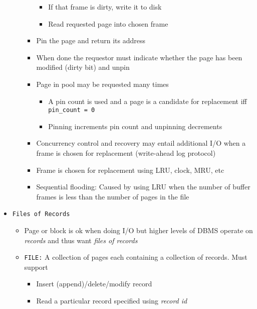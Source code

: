 \documentclass[landscape,8pt]{extarticle}
\newcommand{\code}{\lstinline}
\begin{document}
\begin{multicols}{4}
\begin{itemize}
\begin{itemize}
\begin{itemize}
\begin{itemize}
                                      \item If that frame is dirty, write it to disk
                                      \item Read requested page into chosen frame
                                  \end{itemize}
                            \item Pin the page and return its address
                            \item When done the requestor must indicate whether the page has been modified (dirty bit) and unpin
                            \item Page in pool may be requested many times
                                  \begin{itemize}
                                      \item A pin count is used and a page is a candidate for replacement iff \code{pin_count = 0}
                                      \item Pinning increments pin count and unpinning decrements
                                  \end{itemize}
                            \item Concurrency control and recovery may entail additional I/O when a frame is chosen for replacement (write-ahead log protocol)
                            \item Frame is chosen for replacement using LRU, clock, MRU, etc
                            \item Sequential flooding: Caused by using LRU when the number of buffer frames is less than the number of pages in the file
                        \end{itemize}
              \end{itemize}
        \item \code{Files of Records}
              \begin{itemize}
                  \item Page or block is ok when doing I/O but higher levels of DBMS operate on \emph{records} and thus want \emph{files of records}
                  \item \code{FILE:} A collection of pages each containing a collection of records. Must support
                        \begin{itemize}
                            \item Insert (append)/delete/modify record
                            \item Read a particular record specified using \emph{record id}

\end{itemize}
\end{itemize}
\end{itemize}
\end{multicols}
\end{document}
